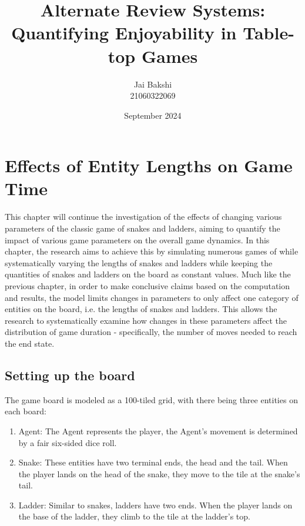 \documentclass[12pt]{report}
\title{Alternate Review Systems:\\ Quantifying Enjoyability in Table-top Games}
\author{Jai Bakshi \\ 21060322069}
\date{September 2024}
\begin{document}
	\maketitle
	\setcounter{chapter}{1}
	\chapter{Effects of Entity Lengths on Game Time}
	This chapter will continue the investigation of the effects of changing various parameters of the classic game of snakes and ladders, aiming to quantify the impact of various game parameters on the overall game dynamics. In this chapter, the research aims to achieve this by simulating numerous games of while systematically varying the lengths of snakes and ladders while keeping the quantities of snakes and ladders on the board as constant values. Much like the previous chapter, in order to make conclusive claims based on the computation and results, the model limits changes in parameters to only affect one category of entities on the board, i.e. the lengths of snakes and ladders. This allows the research to systematically examine how changes in these parameters affect the distribution of game duration - specifically, the number of moves needed to reach the end state.
	\section{Setting up the board}
	The game board is modeled as a 100-tiled grid, with there being three entities on each board:
	\begin{enumerate}
		\item Agent: The Agent represents the player, the Agent's movement is determined by a fair six-sided dice roll. 
		\item Snake: These entities have two terminal ends, the head and the tail. When the player lands on the head of the snake, they move to the tile at the snake's tail.
		\item Ladder: Similar to snakes, ladders have two ends. When the player lands on the base of the ladder, they climb to the tile at the ladder's top.
	\end{enumerate}
\end{document}
